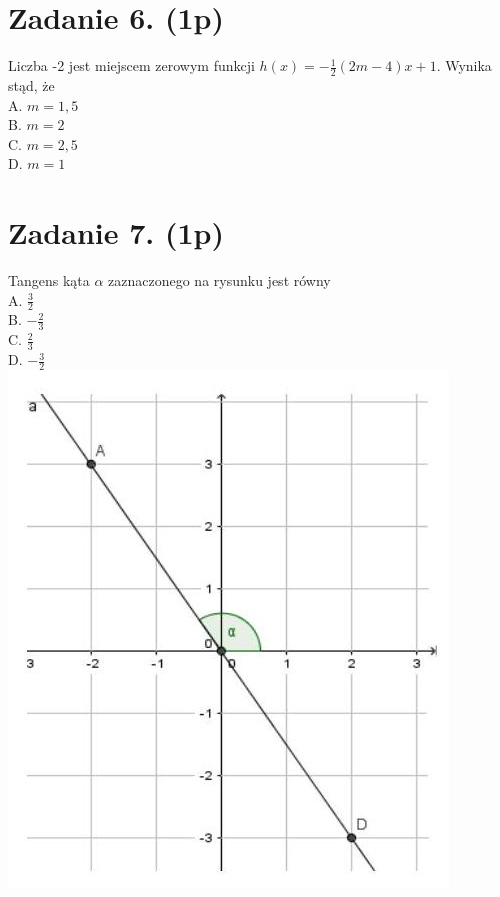 \documentclass[10pt]{article}
\begin{document}
\section*{Zadanie 6. (1p)}
Liczba -2 jest miejscem zerowym funkcji \(h(x)=-\frac{1}{2}(2 m-4) x+1\). Wynika stąd, że\\
A. \(m=1,5\)\\
B. \(m=2\)\\
C. \(m=2,5\)\\
D. \(m=1\)

\section*{Zadanie 7. (1p)}
Tangens kąta \(\alpha\) zaznaczonego na rysunku jest równy\\
A. \(\frac{3}{2}\)\\
B. \(-\frac{2}{3}\)\\
C. \(\frac{2}{3}\)\\
D. \(-\frac{3}{2}\)\\
\includegraphics[max width=\textwidth, center]{2024_11_21_cce9c7ad32a1dbcd58dag-02}
\end{document}
